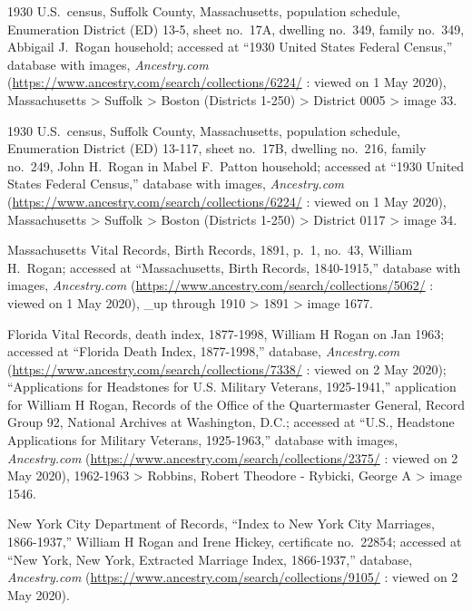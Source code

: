 \begin{thebibliography}{999}
1930 U.S.\ census, Suffolk County, Massachusetts, population schedule, Enumeration District (ED) 13-5, sheet no.\ 17A, dwelling no.\ 349, family no.\ 349, Abbigail J.\ Rogan household; accessed at ``1930 United States Federal Census,'' database with images, \textit{Ancestry.com} (\url{https://www.ancestry.com/search/collections/6224/} : viewed on 1 May 2020), Massachusetts > Suffolk > Boston (Districts 1-250) > District 0005 > image 33.

1930 U.S.\ census, Suffolk County, Massachusetts, population schedule, Enumeration District (ED) 13-117, sheet no.\ 17B, dwelling no.\ 216, family no.\ 249, John H.\ Rogan in Mabel F.\ Patton household; accessed at ``1930 United States Federal Census,'' database with images, \textit{Ancestry.com} (\url{https://www.ancestry.com/search/collections/6224/} : viewed on 1 May 2020), Massachusetts > Suffolk > Boston (Districts 1-250) > District 0117 > image 34.

Massachusetts Vital Records, Birth Records, 1891, p.\ 1, no.\ 43, William H.\ Rogan; accessed at ``Massachusetts, Birth Records, 1840-1915,'' database with images, \textit{Ancestry.com} (\url{https://www.ancestry.com/search/collections/5062/} : viewed on 1 May 2020), \_up through 1910 > 1891 > image 1677.

Florida Vital Records, death index, 1877-1998, William H Rogan on Jan 1963; accessed at ``Florida Death Index, 1877-1998,'' database, \textit{Ancestry.com} (\url{https://www.ancestry.com/search/collections/7338/} : viewed on 2 May 2020); ``Applications for Headstones for U.S. Military Veterans, 1925-1941,'' application for William H Rogan, Records of the Office of the Quartermaster General, Record Group 92, National Archives at Washington, D.C.; accessed at ``U.S., Headstone Applications for Military Veterans, 1925-1963,'' database with images, \textit{Ancestry.com} (\url{https://www.ancestry.com/search/collections/2375/} : viewed on 2 May 2020), 1962-1963 > Robbins, Robert Theodore - Rybicki, George A > image 1546.

New York City Department of Records, ``Index to New York City Marriages, 1866-1937,'' William H Rogan and Irene Hickey, certificate no.\ 22854; accessed at ``New York, New York, Extracted Marriage Index, 1866-1937,'' database, \textit{Ancestry.com} (\url{https://www.ancestry.com/search/collections/9105/} : viewed on 2 May 2020).


\end{thebibliography}
